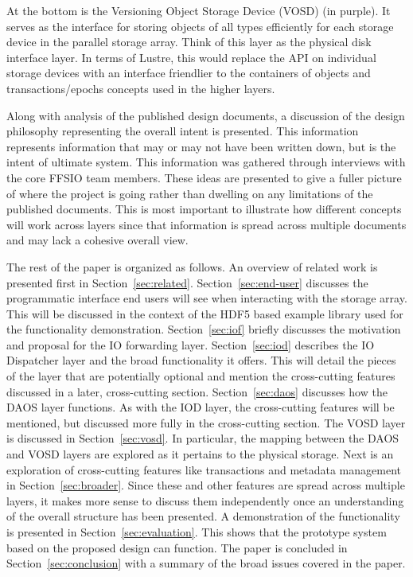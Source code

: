\documentclass[conference]{IEEEtran} \pdfpagewidth=8.5in
\begin{document}
At the bottom is the Versioning Object Storage Device (VOSD) (in purple).  It
serves as the interface for storing objects of all types efficiently for each
storage device in the parallel storage array. Think of this layer as the
physical disk interface layer. In terms of Lustre, this would replace the API
on individual storage devices with an interface friendlier to the containers of
objects and transactions/epochs concepts used in the higher layers.

Along with analysis of the published design documents, a discussion of the
design philosophy representing the overall intent is presented. This
information represents information that may or may not have been written down,
but is the intent of ultimate system.  This information was gathered through
interviews with the core FFSIO team members. These ideas are presented to give
a fuller picture of where the project is going rather than dwelling on any
limitations of the published documents. This is most important to illustrate
how different concepts will work across layers since that information is spread
across multiple documents and may lack a cohesive overall view.

The rest of the paper is organized as follows. An overview of related work is
presented first in Section~\ref{sec:related}. Section~\ref{sec:end-user}
discusses the programmatic interface end users will see when interacting with
the storage array. This will be discussed in the context of the HDF5 based
example library used for the functionality demonstration. Section~\ref{sec:iof}
briefly discusses the motivation and proposal for the IO forwarding layer.
Section~\ref{sec:iod} describes the IO Dispatcher layer and the broad
functionality it offers. This will detail the pieces of the layer that are
potentially optional and mention the cross-cutting features discussed in a
later, cross-cutting section. Section~\ref{sec:daos} discusses how the DAOS
layer functions. As with the IOD layer, the cross-cutting features will be
mentioned, but discussed more fully in the cross-cutting section. The VOSD
layer is discussed in Section~\ref{sec:vosd}. In particular, the mapping
between the DAOS and VOSD layers are explored as it pertains to the physical
storage. Next is an exploration of cross-cutting features like transactions and
metadata management in Section~\ref{sec:broader}. Since these and other
features are spread across multiple layers, it makes more sense to discuss them
independently once an understanding of the overall structure has been
presented.  A demonstration of the functionality is presented in
Section~\ref{sec:evaluation}. This shows that the prototype system based on the
proposed design can function. The paper is concluded in
Section~\ref{sec:conclusion} with a summary of the broad issues covered in the
paper.
\end{document}
